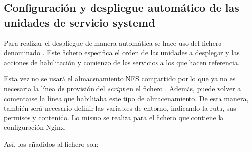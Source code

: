 \subsection{Configuración y despliegue automático de las unidades de servicio systemd}

Para realizar el despliegue de manera automática se hace uso del fichero  denominado . Este fichero especifica el orden de las unidades a desplegar y las acciones de habilitación y comienzo de los servicios a los que hacen referencia.

Esta vez no se usará el almacenamiento NFS compartido por lo que ya no es necesaria la línea de provisión del \textit{script} en el fichero . Además, puede volver a comentarse la línea que habilitaba este tipo de almacenamiento. De esta manera, también será necesario definir las variables de entorno, indicando la ruta, sus permisos y contenido. Lo mismo se realiza para el fichero que contiene la configuración Nginx.

Así, los añadidos al fichero  son:

